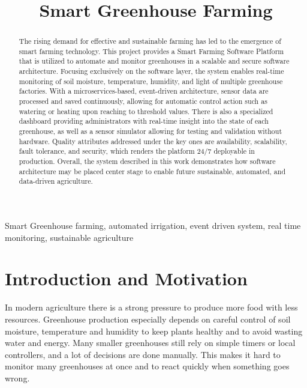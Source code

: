 \documentclass[conference]{IEEEtran}
\begin{document}
      
\title{Smart Greenhouse Farming}

\author{
}
\maketitle
\begin{abstract}
The rising demand for effective and sustainable farming has led to the emergence of smart farming technology.
This project provides a Smart Farming Software Platform that is utilized to automate and monitor greenhouses in a scalable and secure software architecture.
Focusing exclusively on the software layer, the system enables real-time monitoring of soil moisture, temperature, humidity, and light of multiple greenhouse factories.
With a microservices-based, event-driven architecture, sensor data are processed and saved continuously, allowing for automatic control action such as watering or heating upon reaching to threshold values.
There is also a specialized dashboard providing administrators with real-time insight into the state of each greenhouse, as well as a sensor simulator allowing for testing and validation without hardware.
Quality attributes addressed under the key ones are availability, scalability, fault tolerance, and security, which renders the platform 24/7 deployable in production.
Overall, the system described in this work demonstrates how software architecture may be placed center stage to enable future sustainable, automated, and data-driven agriculture.
\end{abstract}

\begin{IEEEkeywords}
Smart Greenhouse farming, automated irrigation, event driven system, real time monitoring, sustainable agriculture
\end{IEEEkeywords}

\section{Introduction and Motivation}
In modern agriculture there is a strong pressure to produce more food with less resources. Greenhouse production especially depends on careful control of soil moisture, temperature and humidity to keep plants healthy and to avoid wasting water and energy. Many smaller greenhouses still rely on simple timers or local controllers, and a lot of decisions are done manually. This makes it hard to monitor many greenhouses at once and to react quickly when something goes wrong.
\end{document}
